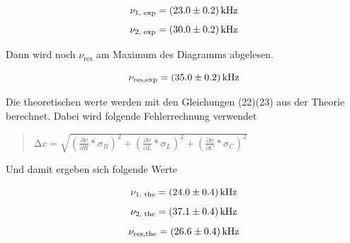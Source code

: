 \begin{equation}
	{\nu_\text{1, exp}} = \SI{23.0 \pm 0.2}{\kHz}
\end{equation}
\begin{equation}
	{\nu_\text{2, exp}} = \SI{30.0 \pm 0.2}{\kHz}
\end{equation}

Dann wird noch $\nu_\text{res}$ am Maximum des Diagramms abgelesen.

\begin{equation}
	{\nu_\text{res,exp}} = \SI{35.0 \pm 0.2}{\kHz}
\end{equation}

Die theoretischen werte werden mit den Gleichungen (22)(23) aus der Theorie berechnet.
Dabei wird folgende Fehlerrechnung verwendet

\begin{quote}
$\increment v = \sqrt{(\frac{\partial \nu}{\partial R} * \sigma_{R})^2 + (\frac{\partial \nu}{\partial L} * \sigma_{L})^2+(\frac{\partial \nu}{\partial C} * \sigma_{C})^2}$
\end{quote}

Und damit ergeben sich folgende Werte

\begin{equation}
	{\nu_\text{1, the}} = \SI{24.0 \pm 0.4}{\kHz}
\end{equation}
\begin{equation}
	{\nu_\text{2, the}} = \SI{37.1 \pm 0.4}{\kHz}
\end{equation}
\begin{equation}
	{\nu_\text{res,the}} = \SI{26.6 \pm 0.4}{\kHz}
\end{equation}

